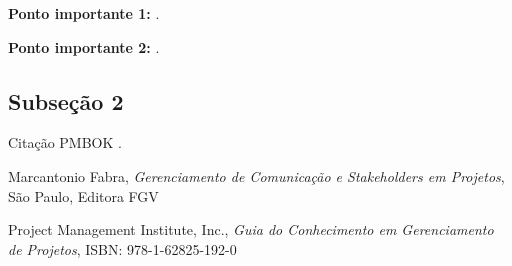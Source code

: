 \documentclass[paper=a4, fontsize=11pt,twoside]{scrartcl}		%
\begin{document}
\textbf{Ponto importante 1:} \lipsum[8].

\textbf{Ponto importante 2:} \lipsum[9].


\subsection{Subseção 2}

Citação PMBOK\cite{pmbok} \lipsum[10-12].




\begin{thebibliography}{1}

  Marcantonio Fabra,
  \emph{Gerenciamento de Comunicação e Stakeholders em Projetos},
  São Paulo,
  Editora FGV

    Project Management Institute, Inc.,
    \emph{Guia do Conhecimento em Gerenciamento de Projetos},
    ISBN: 978-1-62825-192-0


  

\end{thebibliography}
\end{document}
